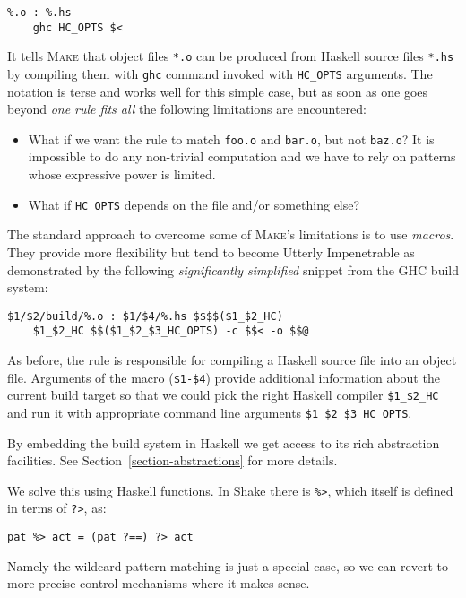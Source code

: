 \begin{verbatim}
%.o : %.hs
    ghc HC_OPTS $<
\end{verbatim}

\noindent It tells \textsc{Make} that object files \texttt{*.o} can be produced
from Haskell source files \texttt{*.hs} by compiling them with \texttt{ghc}
command invoked with \texttt{HC\_OPTS} arguments. The notation is terse and
works well for this simple case, but as soon as one goes beyond \textit{one rule
fits all} the following limitations are encountered:
\begin{itemize}
  \item What if we want the rule to match \texttt{foo.o} and \texttt{bar.o}, but
  not \texttt{baz.o}? It is impossible to do any non-trivial computation and
  we have to rely on patterns whose expressive power is limited.
  \item What if \texttt{HC\_OPTS} depends on the file and/or something else?
\end{itemize}

The standard approach to overcome some of \textsc{Make}'s limitations is to use
\emph{macros}. They provide more flexibility but tend to become Utterly
Impenetrable as demonstrated by the following \emph{significantly simplified}
snippet from the GHC build system:

\begin{verbatim}
$1/$2/build/%.o : $1/$4/%.hs $$$$($1_$2_HC)
    $1_$2_HC $$($1_$2_$3_HC_OPTS) -c $$< -o $$@
\end{verbatim}

\noindent As before, the rule is responsible for compiling a Haskell source
file into an object file. Arguments of the macro (\texttt{\$1-\$4}) provide
additional information about the current build target so that we could pick the
right Haskell compiler \texttt{\$1\_\$2\_HC} and run it with appropriate command
line arguments \texttt{\$1\_\$2\_\$3\_HC\_OPTS}.

By embedding the build system in Haskell we get access to its rich abstraction
facilities. See Section~\ref{section-abstractions} for more details.

We solve this using Haskell functions. In Shake there is \verb"%>", which itself is defined in terms of \verb"?>", as:

\begin{verbatim}
pat %> act = (pat ?==) ?> act
\end{verbatim}

Namely the wildcard pattern matching is just a special case, so we can revert to more precise control mechanisms where it makes sense.

